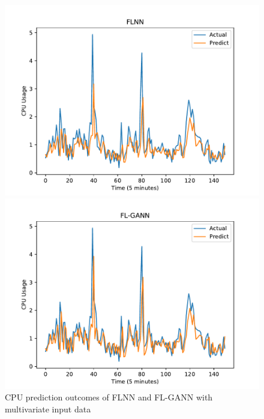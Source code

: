 \documentclass[conference]{IEEEtran}
\begin{document}
\begin{figure}[h]
	\centering
	\begin{minipage}[t]{8cm}
		\centering
		\includegraphics[width=0.8\textwidth =0.2cm 0.2cm 0.2cm 0.2cm]{images/multi_cpu_flnn.pdf}
	\end{minipage}
	\hspace{0.5cm}
	\begin{minipage}[t]{8cm}
		\centering
		\includegraphics[width=0.8\textwidth =0.2cm 0.2cm 0.2cm 0.2cm]{images/multi_cpu_flgann.pdf}
	\end{minipage}
	\caption{CPU prediction outcomes of FLNN and FL-GANN with multivariate input data} 
	\label{tn1_multi_CPU}
\end{figure}
\end{document}
